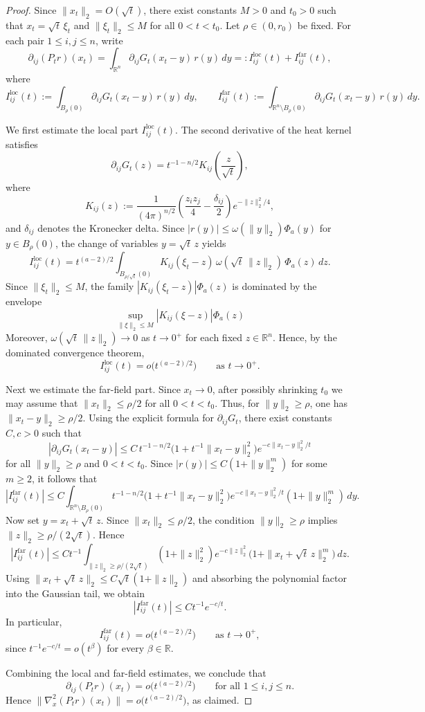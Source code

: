 \documentclass{article}
\begin{document}
\begin{proof}
Since $\|x_t\|_2=O(\sqrt t)$, there exist constants $M>0$ and $t_0>0$ such that $x_t=\sqrt t\,\xi_t$ and $\|\xi_t\|_2\le M$ for all $0<t<t_0$. Let $\rho\in(0,r_0)$ be fixed. For each pair $1\le i,j\le n$, write
$$\partial_{ij}(P_t r)(x_t)=\int_{\mathbb R^n}\partial_{ij}G_t(x_t-y)\,r(y)\,dy=:I_{ij}^{\mathrm{loc}}(t)+I_{ij}^{\mathrm{far}}(t),$$
where
$$I_{ij}^{\mathrm{loc}}(t):=\int_{B_\rho(0)}\partial_{ij}G_t(x_t-y)\,r(y)\,dy,\qquad I_{ij}^{\mathrm{far}}(t):=\int_{\mathbb R^n\setminus B_\rho(0)}\partial_{ij}G_t(x_t-y)\,r(y)\,dy.$$

We first estimate the local part $I_{ij}^{\mathrm{loc}}(t)$. The second derivative of the heat kernel satisfies
$$\partial_{ij}G_t(z)=t^{-1-n/2}K_{ij}\!\left(\frac{z}{\sqrt t}\right),$$
where
$$K_{ij}(z):=\frac{1}{(4\pi)^{n/2}}\left(\frac{z_iz_j}{4}-\frac{\delta_{ij}}{2}\right)e^{-\|z\|_2^2/4},$$
and $\delta_{ij}$ denotes the Kronecker delta. Since $|r(y)|\le \omega(\|y\|_2)\Phi_a(y)$ for $y\in B_\rho(0)$, the change of variables $y=\sqrt t\,z$ yields
$$I_{ij}^{\mathrm{loc}}(t)=t^{(a-2)/2}\int_{B_{\rho/\sqrt t}(0)}K_{ij}(\xi_t-z)\,\omega(\sqrt t\,\|z\|_2)\,\Phi_a(z)\,dz.$$
Since $\|\xi_t\|_2\le M$, the family $|K_{ij}(\xi_t-z)|\Phi_a(z)$ is dominated by the envelope 
$$\sup_{\|\xi\|_2\le M}|K_{ij}(\xi-z)|\Phi_a(z)$$
Moreover, $\omega(\sqrt t\,\|z\|_2)\to0$ as $t \to 0^+$ for each fixed $z\in\mathbb R^n$. Hence, by the dominated convergence theorem,
$$I_{ij}^{\mathrm{loc}}(t)=o\bigl(t^{(a-2)/2}\bigr)\qquad\text{as }t\to0^+.$$

Next we estimate the far-field part. Since $x_t\to0$, after possibly shrinking $t_0$ we may assume that $\|x_t\|_2\le \rho/2$ for all $0<t<t_0$. Thus, for $\|y\|_2\ge \rho$, one has $\|x_t-y\|_2\ge \rho/2$. Using the explicit formula for $\partial_{ij}G_t$, there exist constants $C,c>0$ such that
$$|\partial_{ij}G_t(x_t-y)|\le C\,t^{-1-n/2}\bigl(1+t^{-1}\|x_t-y\|_2^2\bigr)e^{-c\|x_t-y\|_2^2/t}$$
for all $\|y\|_2\ge \rho$ and $0<t<t_0$. Since $|r(y)|\le C(1+\|y\|_2^m)$ for some $m\ge2$, it follows that
$$|I_{ij}^{\mathrm{far}}(t)|\le C\int_{\mathbb R^n\setminus B_\rho(0)} t^{-1-n/2}\bigl(1+t^{-1}\|x_t-y\|_2^2\bigr)e^{-c\|x_t-y\|_2^2/t}(1+\|y\|_2^m)\,dy.$$
Now set $y=x_t+\sqrt t\,z$. Since $\|x_t\|_2\le \rho/2$, the condition $\|y\|_2\ge \rho$ implies $\|z\|_2\ge \rho/(2\sqrt t)$. Hence
$$|I_{ij}^{\mathrm{far}}(t)|\le C t^{-1}\int_{\|z\|_2\ge \rho/(2\sqrt t)} (1+\|z\|_2^2)e^{-c\|z\|_2^2}\bigl(1+\|x_t+\sqrt t\,z\|_2^m\bigr)\,dz.$$
Using $\|x_t+\sqrt t\,z\|_2\le C\sqrt t(1+\|z\|_2)$ and absorbing the polynomial factor into the Gaussian tail, we obtain
$$|I_{ij}^{\mathrm{far}}(t)|\le C t^{-1}e^{-c/t}.$$
In particular,
$$I_{ij}^{\mathrm{far}}(t)=o\bigl(t^{(a-2)/2}\bigr)\qquad\text{as }t\to0^+,$$
since $t^{-1}e^{-c/t}=o(t^\beta)$ for every $\beta\in\mathbb R$.

Combining the local and far-field estimates, we conclude that
$$\partial_{ij}(P_t r)(x_t)=o\bigl(t^{(a-2)/2}\bigr)\qquad\text{for all }1\le i,j\le n.$$
Hence $\|\nabla_x^2(P_t r)(x_t)\|=o\bigl(t^{(a-2)/2}\bigr)$, as claimed.
\end{proof}
\end{document}
